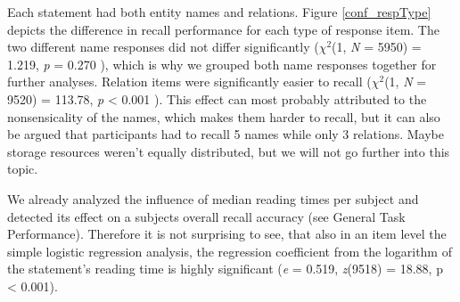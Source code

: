 \documentclass[a4paper,man,natbib,floatsintext,import]{apa6}
\begin{document}
Each statement had both entity names and relations. Figure \ref{conf_respType} depicts the difference in recall performance for each type of response item. The two different name responses did not differ significantly (\textit{${\chi}^2$}(1, \textit{N} = 5950) = 1.219, \textit{p} = 0.270 ), which is why we grouped both name responses together for further analyses. Relation items were significantly easier to recall (\textit{${\chi}^2$}(1, \textit{N} = 9520) = 113.78, \textit{p} < 0.001 ). This effect can most probably attributed to the nonsensicality of the names, which makes them harder to recall, but it can also be argued that participants had to recall 5 names while only 3 relations. Maybe storage resources weren't equally distributed, but we will not go further into this topic.

We already analyzed the influence of median reading times per subject and detected its effect on a subjects overall recall accuracy (see General Task Performance). Therefore it is not surprising to see, that also in an item level the simple logistic regression analysis, the regression coefficient from the logarithm of the statement's reading time is highly significant (\textit{e} = 0.519, \textit{z}(9518) = 18.88, p < 0.001).
\end{document}
